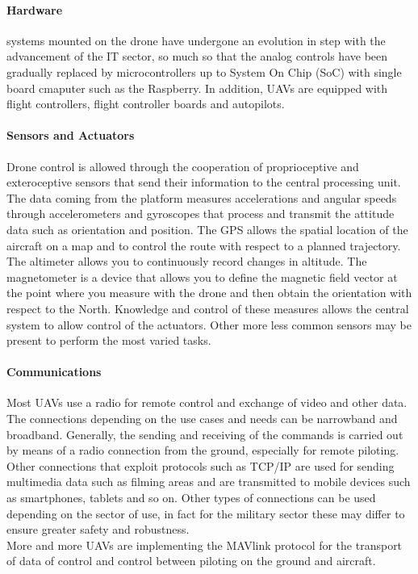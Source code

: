 \paragraph{Hardware}
systems mounted on the drone have undergone an evolution in step
with the advancement of the IT sector, so much so that the analog controls have
been gradually replaced by microcontrollers up to System On Chip (SoC) with
single board cmaputer such as the Raspberry. In addition, UAVs are equipped with
flight controllers, flight controller boards and autopilots.
%
\paragraph{Sensors and Actuators}
Drone control is allowed through the cooperation of proprioceptive and
exteroceptive sensors that send their information to the central processing
unit.
The data coming from the platform measures accelerations and angular speeds
through accelerometers and gyroscopes that process and transmit the attitude
data such as orientation and position.
The GPS allows the spatial location of the aircraft on a map and to control the
route with respect to a planned trajectory. The altimeter allows you to
continuously record changes in altitude. The magnetometer is a device that
allows you to define the magnetic field vector at the point where you measure
with the drone and then obtain the orientation with respect to the North.
Knowledge and control of these measures allows the central system to allow
control of the actuators. Other more less common sensors may be present to
perform the most varied tasks.
%
\paragraph{Communications}
Most UAVs use a radio for remote control and exchange of video and other data.
The connections depending on the use cases and needs can be narrowband and
broadband. Generally, the sending and receiving of the commands is carried out
by means of a radio connection from the ground, especially for remote piloting.\\
Other connections that exploit protocols such as TCP/IP are used for sending
multimedia data such as filming areas and are transmitted to mobile devices such
as smartphones, tablets and so on.
Other types of connections can be used depending on the sector of use, in fact
for the military sector these may differ to ensure greater safety and
robustness.\\ 
More and more UAVs are implementing the MAVlink protocol for the
transport of data of control and control between piloting on the ground and
aircraft.
%
%
